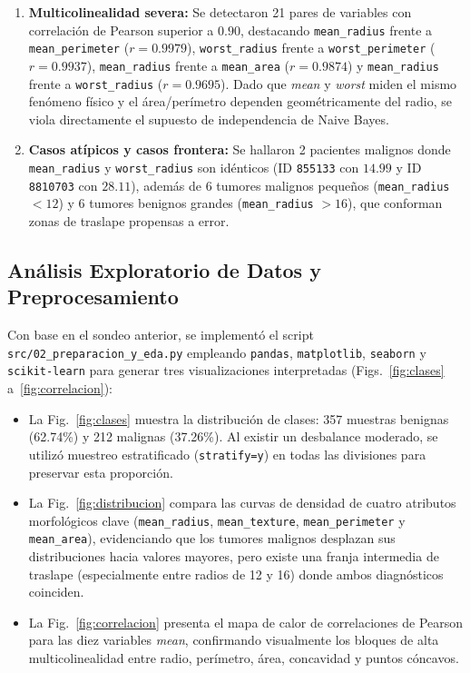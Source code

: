 \documentclass[conference]{IEEEtran}
\begin{document}
\begin{enumerate}
    \item \textbf{Multicolinealidad severa:} Se detectaron 21 pares de variables con correlación de Pearson superior a $0.90$, destacando \texttt{mean\_radius} frente a \texttt{mean\_perimeter} ($r = 0.9979$), \texttt{worst\_radius} frente a \texttt{worst\_perimeter} ($r = 0.9937$), \texttt{mean\_radius} frente a \texttt{mean\_area} ($r = 0.9874$) y \texttt{mean\_radius} frente a \texttt{worst\_radius} ($r = 0.9695$). Dado que \textit{mean} y \textit{worst} miden el mismo fenómeno físico y el área/perímetro dependen geométricamente del radio, se viola directamente el supuesto de independencia de Naive Bayes.
    \item \textbf{Casos atípicos y casos frontera:} Se hallaron 2 pacientes malignos donde \texttt{mean\_radius} y \texttt{worst\_radius} son idénticos (ID \texttt{855133} con $14.99$ y ID \texttt{8810703} con $28.11$), además de 6 tumores malignos pequeños (\texttt{mean\_radius} $< 12$) y 6 tumores benignos grandes (\texttt{mean\_radius} $> 16$), que conforman zonas de traslape propensas a error.
\end{enumerate}

\subsection{Análisis Exploratorio de Datos y Preprocesamiento}

Con base en el sondeo anterior, se implementó el script \texttt{src/02\_preparacion\_y\_eda.py} empleando \texttt{pandas}, \texttt{matplotlib}, \texttt{seaborn} y \texttt{scikit-learn} para generar tres visualizaciones interpretadas (Figs.~\ref{fig:clases} a~\ref{fig:correlacion}):

\begin{itemize}
    \item La Fig.~\ref{fig:clases} muestra la distribución de clases: 357 muestras benignas (62.74\%) y 212 malignas (37.26\%). Al existir un desbalance moderado, se utilizó muestreo estratificado (\texttt{stratify=y}) en todas las divisiones para preservar esta proporción.
    \item La Fig.~\ref{fig:distribucion} compara las curvas de densidad de cuatro atributos morfológicos clave (\texttt{mean\_radius}, \texttt{mean\_texture}, \texttt{mean\_perimeter} y \texttt{mean\_area}), evidenciando que los tumores malignos desplazan sus distribuciones hacia valores mayores, pero existe una franja intermedia de traslape (especialmente entre radios de 12 y 16) donde ambos diagnósticos coinciden.
    \item La Fig.~\ref{fig:correlacion} presenta el mapa de calor de correlaciones de Pearson para las diez variables \textit{mean}, confirmando visualmente los bloques de alta multicolinealidad entre radio, perímetro, área, concavidad y puntos cóncavos.
\end{itemize}
\end{document}
